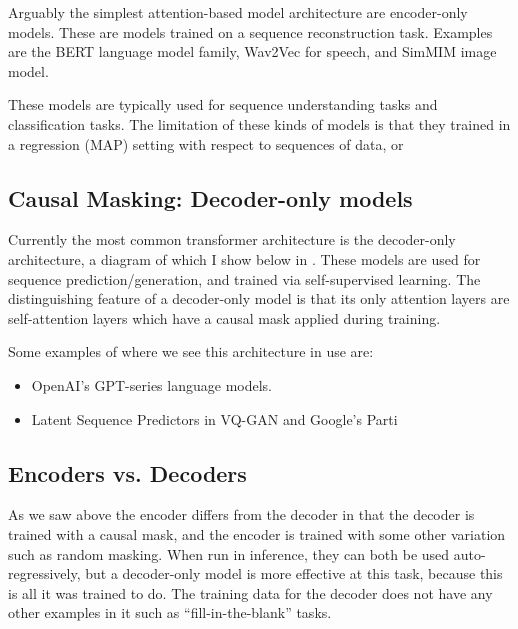 Arguably the simplest attention-based model architecture are encoder-only models. These are models trained on a sequence reconstruction task. Examples are the BERT \cite{bert} language model family, Wav2Vec \cite{wav2vec} for speech, and SimMIM \cite{sim-mim} image model.

These models are typically used for sequence understanding tasks and classification tasks. The limitation of these kinds of models is that they  trained in a regression (MAP) setting with respect to sequences of data, or

\subsection{Causal Masking: Decoder-only models}
\label{ss:decoder-only}


Currently the most common transformer architecture is the decoder-only architecture, a diagram of which I show below in . These models are used for sequence prediction/generation, and trained via self-supervised learning. The distinguishing feature of a decoder-only model is that its only attention layers are self-attention layers which have a causal mask applied during training.

Some examples of where we see this architecture in use are:
\begin{itemize}
    \item OpenAI's GPT-series \cite{gpt1, gpt2, gpt3} language models.
    \item Latent Sequence Predictors in VQ-GAN \cite{vqgan} and Google's Parti \cite{parti}
\end{itemize}






\subsection {Encoders vs. Decoders}
\label{ss:enc-vs-dec}

As we saw above the encoder differs from the decoder in that the decoder is trained with a causal mask, and the encoder is trained with some other variation such as random masking. When run in inference, they can both be used auto-regressively, but a decoder-only model is more effective at this task, because this is all it was trained to do. The training data for the decoder does not have any other examples in it such as ``fill-in-the-blank'' tasks.


